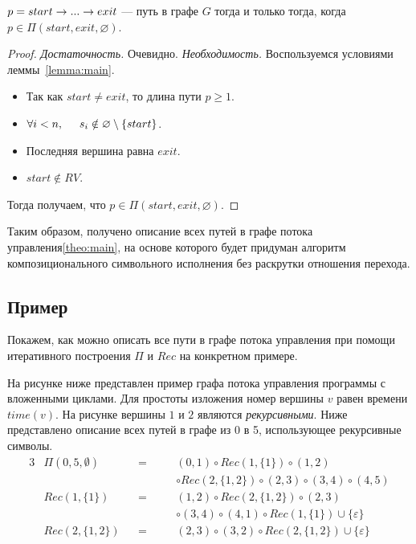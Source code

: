 \begin{thrm}
\label{theo:main}
$p = start \rightarrow ... \rightarrow exit$ --- путь в графе $G$ тогда и только тогда, когда $p \in \Pi(start,exit,\varnothing)$. 
\end{thrm}

\begin{proof}
\emph{Достаточность.} Очевидно.
\emph{Необходимость.}
Воспользуемся условиями леммы~\ref{lemma:main}.
\begin{itemize}
    \item Так как $start \neq exit$, то длина пути $p \geq 1$.
    \item $\forall i < n, \hspace{5mm} s_i \notin \varnothing \setminus \{start\}$.
    \item Последняя вершина равна $exit$.
    \item $start \notin RV$.
\end{itemize}
Тогда получаем, что $p \in \Pi(start,exit,\varnothing)$.
\end{proof}

Таким образом, получено описание всех путей в графе потока управления\ref{theo:main}, на основе которого будет придуман алгоритм композиционального символьного исполнения без раскрутки отношения перехода.


\subsection{Пример}
Покажем, как можно описать все пути в графе потока управления при помощи итеративного построения $\Pi$ и $Rec$ на конкретном примере.

На рисунке ниже представлен пример графа потока управления программы с вложенными циклами. Для простоты изложения номер вершины $v$ равен времени $time(v)$. На рисунке вершины $1$ и $2$ являются \emph{рекурсивными}. Ниже представлено описание всех путей в графе из 0 в 5, использующее рекурсивные символы.
%
\begin{alignat*}{3}
&\Pi(0, 5, \emptyset) &&= \quad &&(0,1) \circ Rec(1,\{1\}) \circ (1,2) \\
&       \quad         &&  \quad &&\circ Rec(2,\{1,2\}) \circ (2,3) \circ (3,4) \circ (4,5) \\
&Rec(1,\{1\})         &&= \quad &&(1,2) \circ Rec(2,\{1,2\}) \circ (2,3) \\ 
&       \quad         &&  \quad &&\circ (3,4) \circ (4,1) \circ Rec(1,\{1\}) \cup \{\varepsilon\} \\
&Rec(2,\{1,2\})       &&= \quad &&(2,3) \circ (3,2) \circ Rec(2,\{1,2\}) \cup \{\varepsilon\}
\end{alignat*}

